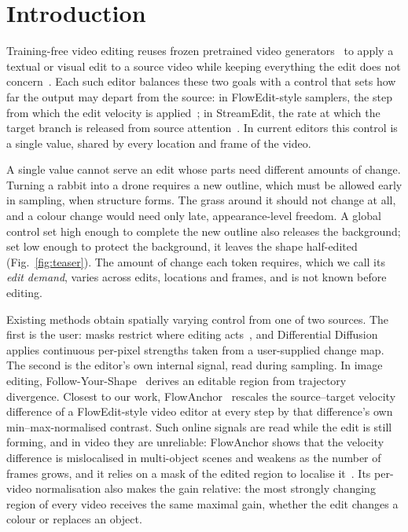 
\section{Introduction}
\label{sec:intro}

Training-free video editing reuses frozen pretrained video generators~\cite{wan2025,selfforcing2025} to apply a textual or visual edit to a source video while keeping everything the edit does not concern~\cite{flowedit,tokenflow2024,streamedit2026}.
Each such editor balances these two goals with a control that sets how far the output may depart from the source: in FlowEdit-style samplers, the step from which the edit velocity is applied~\cite{flowedit,five2025}; in StreamEdit, the rate at which the target branch is released from source attention~\cite{streamedit2026}.
In current editors this control is a single value, shared by every location and frame of the video.

A single value cannot serve an edit whose parts need different amounts of change.
Turning a rabbit into a drone requires a new outline, which must be allowed early in sampling, when structure forms. The grass around it should not change at all, and a colour change would need only late, appearance-level freedom.
A global control set high enough to complete the new outline also releases the background; set low enough to protect the background, it leaves the shape half-edited (Fig.~\ref{fig:teaser}).
The amount of change each token requires, which we call its \emph{edit demand}, varies across edits, locations and frames, and is not known before editing.

Existing methods obtain spatially varying control from one of two sources.
The first is the user: masks restrict where editing acts~\cite{objwiper,flowdirector}, and Differential Diffusion~\cite{diffdiff} applies continuous per-pixel strengths taken from a user-supplied change map.
The second is the editor's own internal signal, read during sampling.
In image editing, Follow-Your-Shape~\cite{fys} derives an editable region from trajectory divergence.
Closest to our work, FlowAnchor~\cite{flowanchor} rescales the source--target velocity difference of a FlowEdit-style video editor at every step by that difference's own min--max-normalised contrast.
Such online signals are read while the edit is still forming, and in video they are unreliable: FlowAnchor shows that the velocity difference is mislocalised in multi-object scenes and weakens as the number of frames grows, and it relies on a mask of the edited region to localise it~\cite{flowanchor}.
Its per-video normalisation also makes the gain relative: the most strongly changing region of every video receives the same maximal gain, whether the edit changes a colour or replaces an object.

